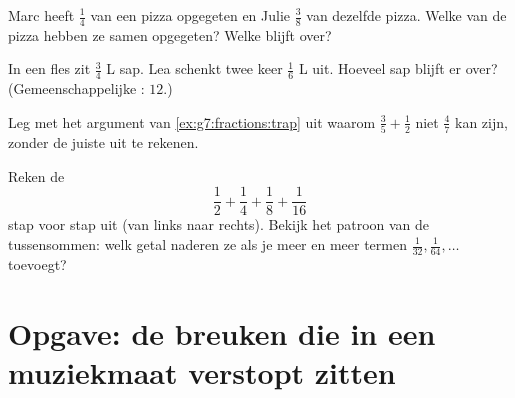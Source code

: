 \begin{exercise}[$\star\star$]\label{exo:g7:fractions:9}
Marc heeft $\frac14$ van een pizza opgegeten en Julie $\frac38$ van dezelfde
pizza. Welke  van de pizza hebben ze samen opgegeten? Welke  blijft
over?
\end{exercise}

\begin{exercise}[$\star\star$]\label{exo:g7:fractions:10}
In een fles zit $\frac34$ L sap. Lea schenkt twee keer $\frac16$ L uit. Hoeveel
sap blijft er over? (Gemeenschappelijke : $12$.)
\end{exercise}

\begin{exercise}[$\star\star$]\label{exo:g7:fractions:11}
Leg met het argument van \cref{ex:g7:fractions:trap} uit waarom
$\frac35 + \frac12$ niet $\frac{4}{7}$ kan zijn, zonder de juiste  uit te
rekenen.
\end{exercise}

\begin{exercise}[$\star\star\star$]\label{exo:g7:fractions:12}
Reken de 
\[
\frac12 + \frac14 + \frac18 + \frac{1}{16}
\]
stap voor stap uit (van links naar rechts). Bekijk het patroon van de
tussensommen: welk getal naderen ze als je meer en meer termen
$\frac{1}{32}, \frac{1}{64}, \dots$ toevoegt?
\end{exercise}

\section{Opgave: de breuken die in een muziekmaat verstopt zitten}


